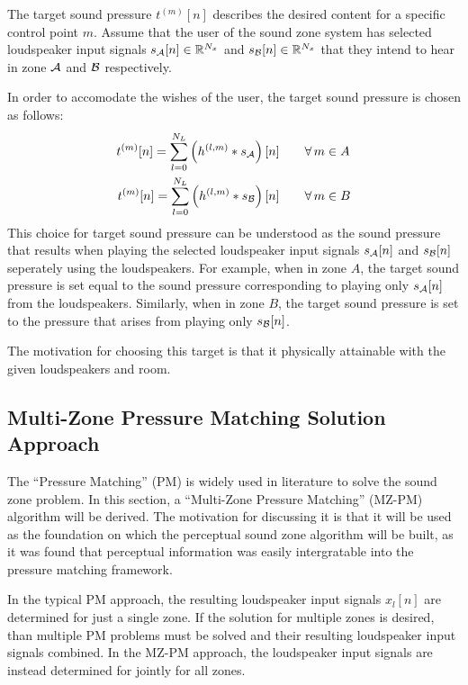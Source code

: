 The target sound pressure $t^{(m)}[n]$ describes the desired content for a specific control point $m$. 
Assume that the user of the sound zone system has selected loudspeaker input signals $s_{\mathcal{A}}[n]\in\mathbb{R}^{N_x}$ and
$s_{\mathcal{B}}[n]\in\mathbb{R}^{N_x}$ that they intend to hear in zone $\mathcal{A}$ and $\mathcal{B}$ respectively.

In order to accomodate the wishes of the user, the target sound pressure is chosen as follows: 
\begin{align}
    t^{(m)}[n] = \sum_{l=0}^{N_L} \left(h^{(l,m)} \ast s_{\mathcal{A}}\right)[n]\qquad &\forall\,m\in A\\
    t^{(m)}[n] = \sum_{l=0}^{N_L} \left(h^{(l,m)} \ast s_{\mathcal{B}}\right)[n]\qquad &\forall\,m\in B
\end{align}
This choice for target sound pressure can be understood as the sound pressure that results when playing the
selected loudspeaker input signals $s_{\mathcal{A}}[n]$ and $s_{\mathcal{B}}[n]$ seperately using the loudspeakers.
For example, when in zone $A$, the target sound pressure is set equal to the sound pressure corresponding to playing only $s_{\mathcal{A}}[n]$ from the loudspeakers.
Similarly, when in zone $B$, the target sound pressure is set to the pressure that arises from playing only $s_{\mathcal{B}}[n]$.

The motivation for choosing this target is that it physically attainable with the given loudspeakers and room.

\subsection{Multi-Zone Pressure Matching Solution Approach}
\label{sec:data_model:pressure_matching}
The ``Pressure Matching'' (PM) is widely used in literature to solve the sound zone problem.
In this section, a ``Multi-Zone Pressure Matching'' (MZ-PM) algorithm will be derived.
The motivation for discussing it is that it will be used as the foundation on which the perceptual sound zone algorithm will be built, 
as it was found that perceptual information was easily intergratable into the pressure matching framework.

In the typical PM approach, the resulting loudspeaker input signals $x_l[n]$ are determined for just a single zone.
If the solution for multiple zones is desired, than multiple PM problems must be solved and their resulting loudspeaker input signals combined. 
In the MZ-PM approach, the loudspeaker input signals are instead determined for jointly for all zones.


